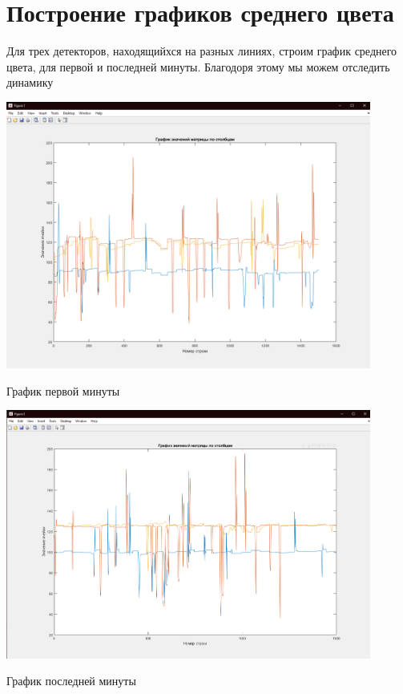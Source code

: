 \documentclass[a4paper,12pt]{article}
\begin{document}
\section*{Построение графиков среднего цвета}
Для трех детекторов, находящийхся на разных линиях, строим график среднего цвета,
для первой и последней минуты. Благодоря этому мы можем отследить динамику
\begin{center}
\includegraphics[width=0.9\textwidth]{median_color_first.png}
\end{center}
\begin{center}
График первой минуты
\end{center}
\begin{center}
\includegraphics[width=0.9\textwidth]{median_color_last.png}
\end{center}
\begin{center}
График последней минуты
\end{center}
\end{document}
